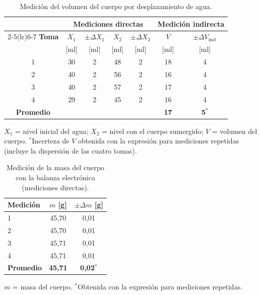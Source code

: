 \documentclass[12pt,a4paper]{article}
\newcommand{\hdr}[1]{\textbf{#1}}
\begin{document}
\begin{table}[H]
\centering
\small
\caption{Medición del volumen del cuerpo por desplazamiento de agua.}
\label{tab:volumen}
\begin{tabular}{ccccccc}
  \toprule
  & \multicolumn{4}{c}{\hdr{Mediciones directas}} & \multicolumn{2}{c}{\hdr{Medición indirecta}} \\
  \cmidrule(lr){2-5}\cmidrule(lr){6-7}
  \hdr{Toma} & \hdr{$X_1$} & \hdr{$\pm\Delta X_1$} & \hdr{$X_2$} & \hdr{$\pm\Delta X_2$} &
  \hdr{$V$} & \hdr{$\pm\Delta V_{\text{inst}}$} \\
  & [ml] & [ml] & [ml] & [ml] & [ml] & [ml] \\ \midrule
  1 & 30 & 2 & 48 & 2 & 18 & 4 \\
  2 & 40 & 2 & 56 & 2 & 16 & 4 \\
  3 & 40 & 2 & 57 & 2 & 17 & 4 \\
  4 & 29 & 2 & 45 & 2 & 16 & 4 \\ \midrule
  \textbf{Promedio} & & & & & \textbf{17} & \textbf{5}$^{*}$ \\
  \bottomrule
\end{tabular}

\smallskip
\begin{minipage}{0.8\textwidth}\footnotesize
$X_1$ = nivel inicial del agua; $X_2$ = nivel con el cuerpo sumergido; $V$ = volumen del
cuerpo. $^{*}$Incerteza de $V$ obtenida con la expresión para mediciones repetidas
(incluye la dispersión de las cuatro tomas).
\end{minipage}
\end{table}

\begin{table}[H]
\centering
\small
\caption{Medición de la masa del cuerpo con la balanza electrónica (mediciones directas).}
\label{tab:masa}
\begin{tabular}{lcc}
  \toprule
  \hdr{Medición} & \hdr{$m$ [g]} & \hdr{$\pm\Delta m$ [g]} \\ \midrule
  1 & 45,70 & 0,01 \\
  2 & 45,70 & 0,01 \\
  3 & 45,71 & 0,01 \\
  4 & 45,71 & 0,01 \\ \midrule
  \textbf{Promedio} & \textbf{45,71} & \textbf{0,02}$^{*}$ \\
  \bottomrule
\end{tabular}

\smallskip
{\footnotesize $m$ = masa del cuerpo. $^{*}$Obtenida con la expresión para mediciones
repetidas.}
\end{table}
\end{document}

